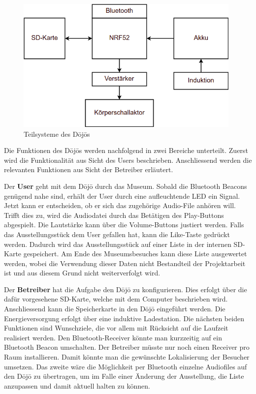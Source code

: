 \begin{figure}[H]
	\begin{center}
		\includegraphics[width=110mm]{data/Loesungskonzept_Teilsysteme.png}
		\caption{Teilsysteme des Dōjōs} %
		\label{fig:Teilsysteme}
	\end{center}
\end{figure}

Die Funktionen des Dōjōs werden nachfolgend in zwei Bereiche unterteilt. Zuerst wird die Funktionalität aus Sicht des Users beschrieben. Anschliessend werden die relevanten Funktionen aus Sicht der Betreiber erläutert.

Der \textbf{User} geht mit dem Dōjō durch das Museum. Sobald die Bluetooth Beacons genügend nahe sind, erhält der User durch eine aufleuchtende LED ein Signal. Jetzt kann er entscheiden, ob er sich das zugehörige Audio-File anhören will. Trifft dies zu, wird die Audiodatei durch das Betätigen des Play-Buttons abgespielt. Die Lautstärke kann über die Volume-Buttons justiert werden. Falls das Ausstellungsstück dem User gefallen hat, kann die \glqq Like\grqq-Taste gedrückt werden. Dadurch wird das Ausstellungsstück auf einer Liste in der internen SD-Karte gespeichert. Am Ende des Museumsbesuches kann diese Liste ausgewertet werden, wobei die Verwendung dieser Daten nicht Bestandteil der Projektarbeit ist und aus diesem Grund nicht weiterverfolgt wird.

Der \textbf{Betreiber} hat die Aufgabe den Dōjō zu konfigurieren. Dies erfolgt über die dafür vorgesehene SD-Karte, welche mit dem Computer beschrieben wird. Anschliessend kann die Speicherkarte in den Dōjō eingeführt werden. Die Energieversorgung erfolgt über eine induktive Ladestation. Die nächsten beiden Funktionen sind Wunschziele, die vor allem mit Rücksicht auf die Laufzeit realisiert werden. Den Bluetooth-Receiver könnte man kurzzeitig auf ein Bluetooth Beacon umschalten. Der Betreiber müsste nur noch einen Receiver pro Raum installieren. Damit könnte man die gewünschte Lokalisierung der Besucher umsetzen. Das zweite wäre die Möglichkeit per Bluetooth einzelne Audiofiles auf den Dōjō zu übertragen, um im Falle einer Änderung der Ausstellung, die Liste anzupassen und damit aktuell halten zu können.

